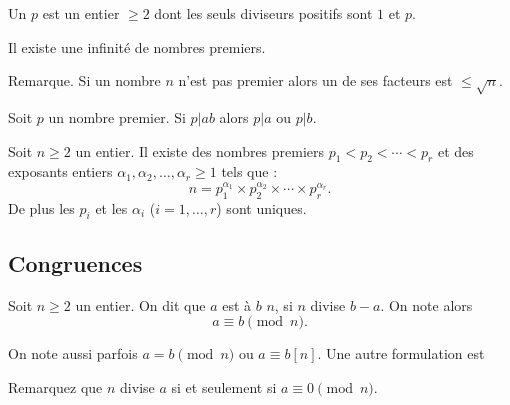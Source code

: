 \documentclass[10pt,class=article,crop=false]{standalone}
\begin{document}
\begin{multicols}{2}
	Un  $p$ est un entier $\ge 2$ dont les seuls diviseurs
	positifs sont $1$ et $p$.


\begin{proposition}
	Il existe une infinité de nombres premiers.
\end{proposition}


Remarque. Si un nombre $n$ n'est pas premier alors un de ses facteurs est $\le \sqrt{n}$.

\begin{proposition}
	Soit $p$ un nombre premier.
	Si $p | ab$ alors $p|a$ ou $p | b$.
\end{proposition}

\begin{theoreme}
	Soit $n \ge 2$ un entier. Il existe des nombres premiers $p_1 < p_2 < \cdots < p_r$
	et des exposants entiers $\alpha_1, \alpha_2, \dots, \alpha_r \ge 1$ tels que :
	$$n = p_1^{\alpha_1} \times p_2^{\alpha_2} \times \cdots \times p_r^{\alpha_r}.$$
	De plus les $p_i$ et les $\alpha_i$ ($i=1,\ldots,r$) sont uniques.
\end{theoreme}


\subsection{Congruences}


	Soit $n \ge 2$ un entier. On dit que $a$ est  à $b$  $n$,
	si $n$ divise $b-a$.
	On note alors
	$$a \equiv b \pmod n.$$


On note aussi parfois $a=b \pmod n$ ou $a \equiv b [n]$.
Une autre formulation est

Remarquez que $n$ divise $a$ si et seulement si $a\equiv 0 \pmod n$.


\end{multicols}
\end{document}
